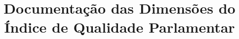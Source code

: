 \documentclass[12pt,a4paper]{article}
\title{Documentação das Dimensões do Índice de Qualidade Parlamentar}
\date{}
\begin{document}
\maketitle
\tableofcontents

\pagebreak

\pagebreak

\pagebreak

\pagebreak

\pagebreak


\pagebreak


\end{document}
